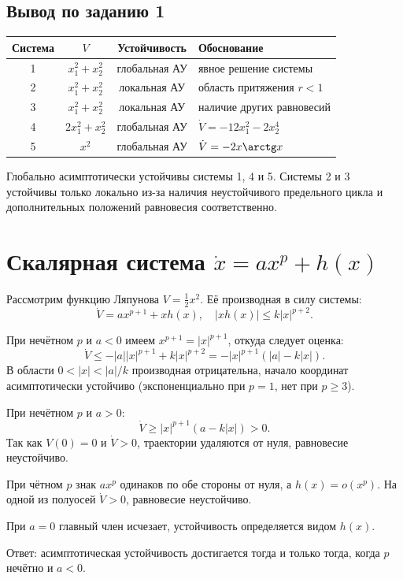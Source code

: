 \documentclass[12pt,a4paper]{article}
\begin{document}
\subsection{Вывод по заданию 1}
\begin{center}
	\begin{tabular}{cccl}
		\toprule
		Система & $V$ & Устойчивость & Обоснование \\
		\midrule
		1 & $x_1^2+x_2^2$ & глобальная АУ & явное решение системы \\
		2 & $x_1^2+x_2^2$ & локальная АУ & область притяжения $r<1$ \\
		3 & $x_1^2+x_2^2$ & локальная АУ & наличие других равновесий \\
		4 & $2x_1^2+x_2^2$ & глобальная АУ & $\dot V=-12x_1^2-2x_2^4$ \\
		5 & $x^2$ & глобальная АУ & $\dot V=-2x\arctg x$ \\
		\bottomrule
	\end{tabular}
\end{center}
Глобально асимптотически устойчивы системы 1, 4 и 5. Системы 2 и 3 устойчивы только локально из-за наличия неустойчивого предельного цикла и дополнительных положений равновесия соответственно.
	
	
	\newpage
\section{Скалярная система $\dot x = ax^p+h(x)$}


Рассмотрим функцию Ляпунова $V=\tfrac12x^2$. Её производная в силу системы:
\[
\dot V = ax^{p+1} + xh(x), \quad |xh(x)| \le k|x|^{p+2}.
\]

При нечётном $p$ и $a<0$ имеем $x^{p+1}=|x|^{p+1}$, откуда следует оценка:
\[
\dot V \le -|a||x|^{p+1} + k|x|^{p+2} = -|x|^{p+1}(|a|-k|x|).
\]
В области $0<|x|<|a|/k$ производная отрицательна, начало координат асимптотически устойчиво (экспоненциально при $p=1$, нет при $p\ge3$).

При нечётном $p$ и $a>0$:
\[
\dot V \ge |x|^{p+1}(a-k|x|) > 0.
\]
Так как $V(0)=0$ и $\dot V>0$, траектории удаляются от нуля, равновесие неустойчиво.

При чётном $p$ знак $ax^p$ одинаков по обе стороны от нуля, а $h(x)=o(x^p)$. На одной из полуосей $\dot V>0$, равновесие неустойчиво.

При $a=0$ главный член исчезает, устойчивость определяется видом $h(x)$.

Ответ: асимптотическая устойчивость достигается тогда и только тогда, когда $p$ нечётно и $a<0$.
	
\end{document}
